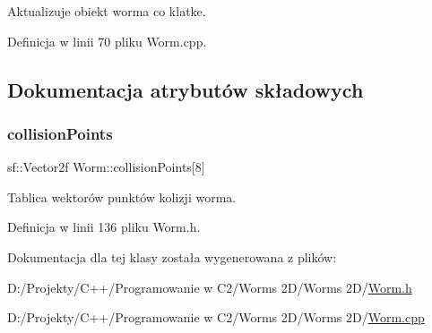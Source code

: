 Aktualizuje obiekt worma co klatke. 



Definicja w linii 70 pliku Worm.\+cpp.



\subsection{Dokumentacja atrybutów składowych}
\mbox{\label{class_worm_a6e519d20cdeca0c88847c0b7284ca302}} 
\subsubsection{\texorpdfstring{collision\+Points}{collisionPoints}}
{\footnotesize\ttfamily sf\+::\+Vector2f Worm\+::collision\+Points\mbox{[}8\mbox{]}}



Tablica wektorów punktów kolizji worma. 



Definicja w linii 136 pliku Worm.\+h.



Dokumentacja dla tej klasy została wygenerowana z plików\+:\begin{DoxyCompactItemize}
\item 
D\+:/\+Projekty/\+C++/\+Programowanie w C2/\+Worms 2\+D/\+Worms 2\+D/\mbox{\hyperlink{_worm_8h}{Worm.\+h}}\item 
D\+:/\+Projekty/\+C++/\+Programowanie w C2/\+Worms 2\+D/\+Worms 2\+D/\mbox{\hyperlink{_worm_8cpp}{Worm.\+cpp}}\end{DoxyCompactItemize}
